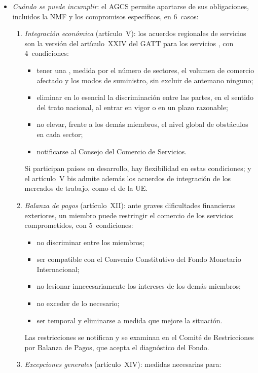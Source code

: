 \documentclass[11pt]{article}
\begin{document}
\begin{itemize}
\item \emph{Cuándo se puede incumplir}: el AGCS permite apartarse de sus obligaciones, incluidos la NMF y los compromisos específicos, en 6~casos\nocite{OMC1994AGCS,OMC1994Marrakech}:
  \begin{enumerate}
  \item \emph{Integración económica} (artículo~V): los acuerdos regionales de servicios son la versión del artículo~XXIV del GATT para los servicios , con 4~condiciones:
    \begin{itemize}
    \item tener una , medida por el número de sectores, el volumen de comercio afectado y los modos de suministro, sin excluir de antemano ninguno;
    \item eliminar en lo esencial la discriminación entre las partes, en el sentido del trato nacional, al entrar en vigor o en un plazo razonable;
    \item no elevar, frente a los demás miembros, el nivel global de obstáculos en cada sector;
    \item notificarse al Consejo del Comercio de Servicios.
    \end{itemize}
    Si participan países en desarrollo, hay flexibilidad en estas condiciones; y el artículo~V bis admite además los acuerdos de integración de los mercados de trabajo, como el de la UE.
  \item \emph{Balanza de pagos} (artículo~XII): ante graves dificultades financieras exteriores, un miembro puede restringir el comercio de los servicios comprometidos, con 5~condiciones:
    \begin{itemize}
    \item no discriminar entre los miembros;
    \item ser compatible con el Convenio Constitutivo del Fondo Monetario Internacional;
    \item no lesionar innecesariamente los intereses de los demás miembros;
    \item no exceder de lo necesario;
    \item ser temporal y eliminarse a medida que mejore la situación.
    \end{itemize}
    Las restricciones se notifican y se examinan en el Comité de Restricciones por Balanza de Pagos, que acepta el diagnóstico del Fondo.
  \item \emph{Excepciones generales} (artículo~XIV): medidas necesarias para:

\end{enumerate}
\end{itemize}
\end{document}
